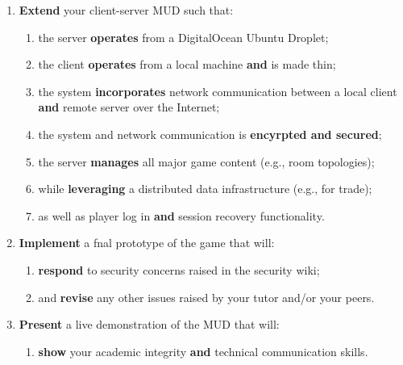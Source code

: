 \documentclass{../../fal_assignment}
\begin{document}
\begin{enumerate}[label=(\Alph*)]
    \item \textbf{Extend} your client-server MUD such that:
    	\begin{enumerate}[label=\roman*.]
    		\item the server \textbf{operates} from a DigitalOcean Ubuntu Droplet;
    		\item the client \textbf{operates} from a local machine \textbf{and} is made thin;
    		\item the system \textbf{incorporates} network communication between a local client \textbf{and} remote server over the Internet;
    		\item the system and network communication is \textbf{encyrpted and secured};
    		\item the server \textbf{manages} all major game content (e.g., room topologies);
    		\item while \textbf{leveraging} a distributed data infrastructure (e.g., for trade);	
    		\item as well as player log in \textbf{and} session recovery functionality.
	\end{enumerate}
    \item \textbf{Implement} a fnal prototype of the game that will:
    	\begin{enumerate}[label=\roman*.]
    		\item \textbf{respond} to security concerns raised in the security wiki;
    		\item and \textbf{revise} any other issues raised by your tutor and/or your peers.
	\end{enumerate}
    \item \textbf{Present} a live demonstration of the MUD that will:
    	\begin{enumerate}[label=\roman*.]
    		\item \textbf{show} your academic integrity \textbf{and} technical communication skills.
	\end{enumerate}
\end{enumerate}

\end{document}
